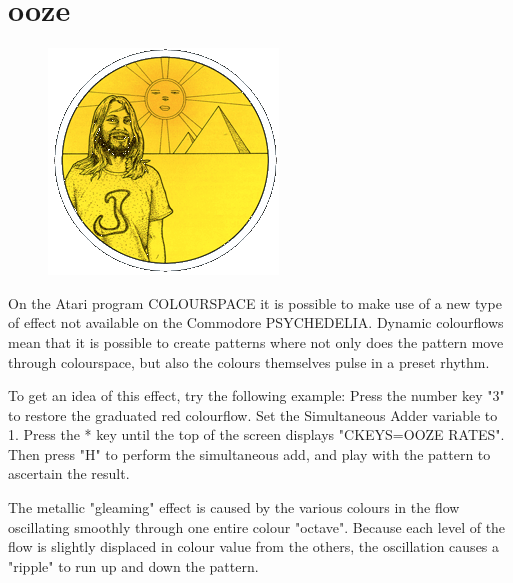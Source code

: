 \chapter{ooze} 
\label{sec:presets}
\lstset{style=6502Style}
\begin{definition}
\setlength{\intextsep}{0pt}%
\setlength{\columnsep}{3pt}%
\begin{figure}
\includegraphics[width=\linewidth]{src/callout/psych.png} 
\end{figure}
\small
On the Atari program COLOURSPACE it is possible to make use of a new type of
effect not available on the Commodore PSYCHEDELIA.  Dynamic colourflows mean
that it is possible to create patterns where not only does the pattern move
through colourspace, but also the colours themselves pulse in a preset rhythm.

To get an idea of this effect, try the following example:  Press the number key
"3" to restore the graduated red colourflow.  Set the Simultaneous Adder
variable to 1.  Press the * key until the top of the screen displays
"CKEYS=OOZE RATES".  Then press "H" to perform the simultaneous add, and play
with the pattern to ascertain the result.

The metallic "gleaming" effect is caused by the various colours in the flow
oscillating smoothly through one entire colour "octave".  Because each level of
the flow is slightly displaced in colour value from the others, the oscillation
causes a "ripple" to run up and down the pattern.


\end{definition}
